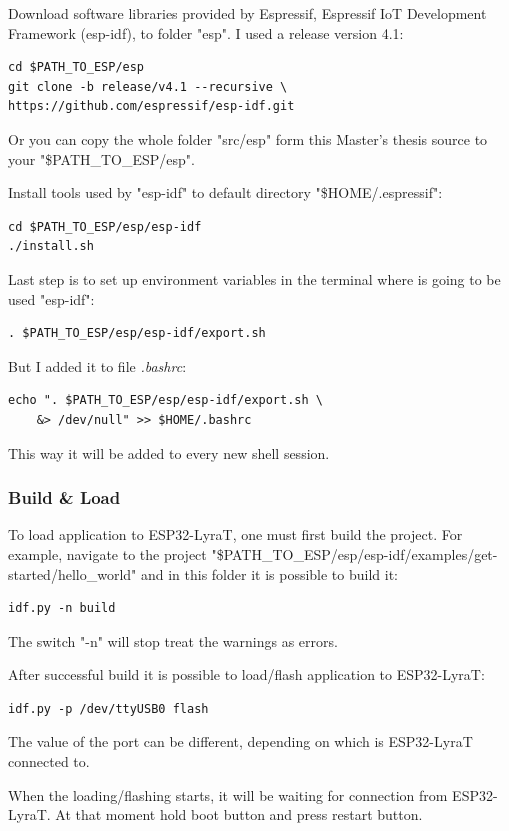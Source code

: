 \documentclass[thesis=M,english]{FITthesis}[2019/12/23]
\begin{document}
\bigskip
\noindent
Download software libraries provided by Espressif, Espressif IoT Development Framework (esp-idf), to folder "esp". I used a release version 4.1:
\begin{lstlisting}[frame=single]
cd $PATH_TO_ESP/esp
git clone -b release/v4.1 --recursive \
https://github.com/espressif/esp-idf.git
\end{lstlisting}
Or you can copy the whole folder "src/esp" form this Master's thesis source to your "\$PATH\_TO\_ESP/esp".

\bigskip
\noindent
Install tools used by "esp-idf" to default directory "\$HOME/.espressif":
\begin{lstlisting}[frame=single]
cd $PATH_TO_ESP/esp/esp-idf
./install.sh
\end{lstlisting}

\bigskip
\noindent
Last step is to set up environment variables in the terminal where is going to be used "esp-idf":
\begin{lstlisting}[frame=single]
. $PATH_TO_ESP/esp/esp-idf/export.sh
\end{lstlisting}
But I added it to file \textit{.bashrc}:
\begin{lstlisting}[frame=single]
echo ". $PATH_TO_ESP/esp/esp-idf/export.sh \
	&> /dev/null" >> $HOME/.bashrc
\end{lstlisting}
This way it will be added to every new shell session.

\subsubsection{Build \& Load}
To load application to ESP32-LyraT, one must first build the project. For example, navigate to the project "\$PATH\_TO\_ESP/esp/esp-idf/examples/get-started/hello\_world" and in this folder it is possible to build it:
\begin{lstlisting}[frame=single]
idf.py -n build
\end{lstlisting}
The switch "-n" will stop treat the warnings as errors.

\bigskip
\noindent
After successful build it is possible to load/flash application to ESP32-LyraT:
\begin{lstlisting}[frame=single]
idf.py -p /dev/ttyUSB0 flash
\end{lstlisting}
The value of the port can be different, depending on which is ESP32-LyraT connected to.

\bigskip
\noindent
When the loading/flashing starts, it will be waiting for connection from ESP32-LyraT. At that moment hold boot button and press restart button.
\end{document}

